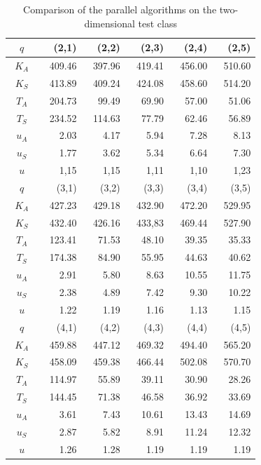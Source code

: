 \begin{table}
\caption{Comparison of the parallel algorithms on the two-dimensional test class}
\label {tab:5_1}
\begin{center}
\begin{tabular}{|c|r|r|r|r|r|}
\hline
$q$ & (2,1) & (2,2) & (2,3) & (2,4) & (2,5)   \\
\hline
$\ \ $$K_A\ \ $  &  $\ \ \ $409.46 & $\ \ \ $397.96 & $\ \ \ $419.41 & $\ \ \ $456.00 & $\ \ \ $510.60  \\
\hline
$K_S$  & 413.89 & 409.24 & 424.08 & 458.60 & 514.20  \\
\hline
$T_A$  & 204.73 &  99.49 &  69.90 &  57.00 &  51.06  \\
\hline
$T_S$  & 234.52 & 114.63 &  77.79 &  62.46 &  56.89  \\
\hline
$u_A$  &   2.03 &   4.17 &   5.94 &   7.28 &   8.13  \\  
\hline
$u_S$  &   1.77 &   3.62 &   5.34 &   6.64 &   7.30  \\
\hline
$u$    &   1,15 &   1,15 &   1,11 &   1,10 &   1,23  \\
\hline
\hline
$q$ & (3,1) & (3,2) & (3,3) & (3,4) & (3,5)   \\
\hline
$K_A$  & 427.23 & 429.18 & 432.90 & 472.20 & 529.95  \\
\hline
$K_S$  & 432.40 & 426.16 & 433,83 & 469.44 & 527.90  \\
\hline
$T_A$  & 123.41 &  71.53 &  48.10 &  39.35 &  35.33  \\
\hline
$T_S$  & 174.38 &  84.90 &  55.95 &  44.63 &  40.62  \\
\hline
$u_A$  &   2.91 &   5.80 &   8.63 &  10.55 &  11.75  \\
\hline
$u_S$  &   2.38 &   4.89 &   7.42 &   9.30 &  10.22  \\
\hline
$u$    &   1.22 &   1.19 &   1.16 &   1.13 &   1.15  \\
\hline
\hline
$q$ & (4,1) & (4,2) & (4,3) & (4,4) & (4,5)   \\
\hline
$K_A$  & 459.88 & 447.12 & 469.32 & 494.40 & 565.20  \\
\hline
$K_S$  & 458.09 & 459.38 & 466.44 & 502.08 & 570.70  \\
\hline
$T_A$  & 114.97 &  55.89 &  39.11 &  30.90 &  28.26  \\
\hline
$T_S$  & 144.45 &  71.38 &  46.58 &  36.92 &  33.69  \\
\hline
$u_A$  &   3.61 &   7.43 &  10.61 &  13.43 &  14.69  \\
\hline
$u_S$  &   2.87 &   5.82 &   8.91 &  11.24 &  12.32  \\
\hline
$u$    &   1.26 &   1.28 &   1.19 &   1.19 &   1.19  \\
\hline
\end{tabular}
\end{center}
\end{table}

